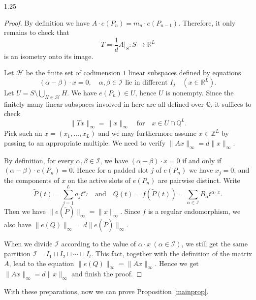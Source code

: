\documentclass[12pt]{article}
\begin{document}
\begin{spacing}{1.25}
\begin{proof}
By definition we have $A\cdot e(P_n)=m_n\cdot e(P_{n-1})$. Therefore, it only remains to check that
$$
T=\frac{1}{d}A|_{S}\colon S\to\mathbb{R}^L
$$
is an isometry onto its image.

Let $\mathcal{H}$ be the finite set of codimension $1$ linear subspaces defined by equations
$$
(\alpha-\beta)\cdot x=0,\quad\alpha,\beta\in\mathcal{I}\text{ lie in different }I_j\quad(x\in\mathbb{R}^L).
$$
Let $U=S\setminus\bigcup\limits_{H\in\mathcal{H}}H$. We have $e(P_n)\in U$, hence $U$ is nonempty. Since the finitely many linear subspaces involved in here are all defined over $\mathbb{Q}$, it suffices to check
$$
\|Tx\|_{\infty}=\|x\|_{\infty}\quad\text{for}\quad x\in U\cap\mathbb{Q}^L.
$$
Pick such an $x=(x_1,\dots,x_L)$ and we may furthermore assume $x\in\mathbb{Z}^L$ by passing to an appropriate multiple. We need to verify $\|Ax\|_{\infty}=d\|x\|_{\infty}$.

By definition, for every $\alpha,\beta\in\mathcal{I}$, we have $(\alpha-\beta)\cdot x=0$ if and only if $(\alpha-\beta)\cdot e(P_n)=0$. Hence for a padded slot $j$ of $e(P_n)$ we have $x_j=0$, and the components of $x$ on the active slots of $e(P_n)$ are pairwise distinct. Write
$$
\tilde{P}(t)=\sum\limits_{j=1}^L a_jt^{x_j}\quad\text{and}\quad Q(t)=f(\tilde{P}(t))=\sum\limits_{\alpha\in\mathcal{I}}B_{\alpha}t^{\alpha\cdot x}.
$$
Then we have $\|e(\tilde{P})\|_{\infty}=\|x\|_{\infty}$. Since $f$ is a regular endomorphism, we also have $\|e(Q)\|_{\infty}=d\|e(\tilde{P})\|_{\infty}$.

When we divide $\mathcal{I}$ according to the value of $\alpha\cdot x\ (\alpha\in\mathcal{I})$, we still get the same partition $\mathcal{I}=I_1\sqcup I_2\sqcup\cdots\sqcup I_t$. This fact, together with the definition of the matrix $A$, lead to the equation $\|e(Q)\|_{\infty}=\|Ax\|_{\infty}$. Hence we get $\|Ax\|_{\infty}=d\|x\|_{\infty}$ and finish the proof.
\end{proof}

With these preparations, now we can prove Proposition \ref{mainprop}.


\end{spacing}
\end{document}
